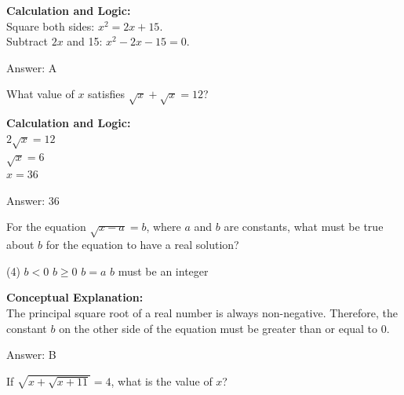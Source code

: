 \documentclass[11pt,paper=a4,answers]{exam}
\begin{document}
\begin{questions}
\begin{solution}
\textbf{Calculation and Logic:} \\
Square both sides: $x^2 = 2x + 15$. \\
Subtract $2x$ and 15: $x^2 - 2x - 15 = 0$.

\vspace{25pt}

Answer: \colorbox{yellow!100}{A}
\end{solution}

\vspace{40pt}

\question
What value of $x$ satisfies $\sqrt{x} + \sqrt{x} = 12$?

\begin{solution}
\textbf{Calculation and Logic:} \\
$2\sqrt{x} = 12$ \\
$\sqrt{x} = 6$ \\
$x = 36$

\vspace{25pt}

Answer: \colorbox{yellow!100}{36}
\end{solution}

\vspace{40pt}

\question
For the equation $\sqrt{x-a} = b$, where $a$ and $b$ are constants, what must be true about $b$ for the equation to have a real solution?
\begin{tasks}(4)
    \task $b < 0$
    \task $b \geq 0$
    \task $b = a$
    \task $b$ must be an integer
\end{tasks}

\begin{solution}
\textbf{Conceptual Explanation:} \\
The principal square root of a real number is always non-negative. Therefore, the constant $b$ on the other side of the equation must be greater than or equal to 0.

\vspace{25pt}

Answer: \colorbox{yellow!100}{B}
\end{solution}

\vspace{40pt}

\question
If $\sqrt{x + \sqrt{x + 11}} = 4$, what is the value of $x$?


\end{questions}
\end{document}
